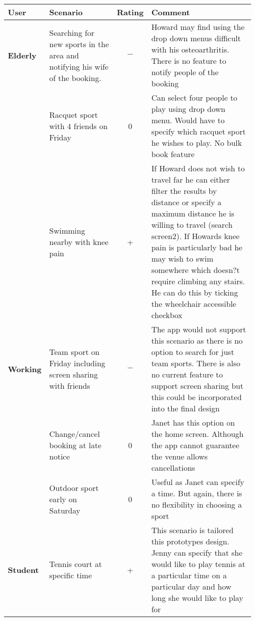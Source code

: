 \begin{center}
	\renewcommand{\arraystretch}{2}
	\begin{longtable}{p{} p{} c p{}}
		\toprule
		\textbf{User} & \textbf{Scenario} & \textbf{Rating} & \textbf{Comment}\\
		\midrule
		\textbf{Elderly} & Searching for new sports in the area and notifying
		his wife of the booking. & $-$ & Howard may find using the drop down
		menus difficult with his osteoarthritis. There is no feature to notify
		people of the booking \\

		& Racquet sport with 4 friends on Friday & 0 & Can select four people
		to play using drop down menu. Would have to specify which racquet sport
		he wishes to play. No bulk book feature \\

		& Swimming nearby with knee pain & + & If Howard does not wish to
		travel far he can either filter the results by distance or specify a
		maximum distance he is willing to travel (search screen2). If Howards
		knee pain is particularly bad he may wish to swim somewhere which
		doesn?t require climbing any stairs. He can do this by ticking the
		wheelchair accessible checkbox \\

		\midrule
		\textbf{Working} & Team sport on Friday including screen
		sharing with friends & $-$ & The app would not support this scenario as
		there is no option to search for just team sports. There is also no
		current feature to support screen sharing but this could be
		incorporated into the final design \\

		& Change/cancel booking at late notice & 0 & Janet has this option on
		the home screen. Although the app cannot guarantee the venue allows
		cancellations \\

		& Outdoor sport early on Saturday & 0 & Useful as Janet can specify a
		time. But again, there is no flexibility in choosing a sport \\

		\midrule
		\textbf{Student} & Tennis court at specific time & + & This
		scenario is tailored this prototypes design. Jenny can specify that she
		would like to play tennis at a particular time on a particular day and
		how long she would like to play for \\


\end{longtable}
\end{center}

